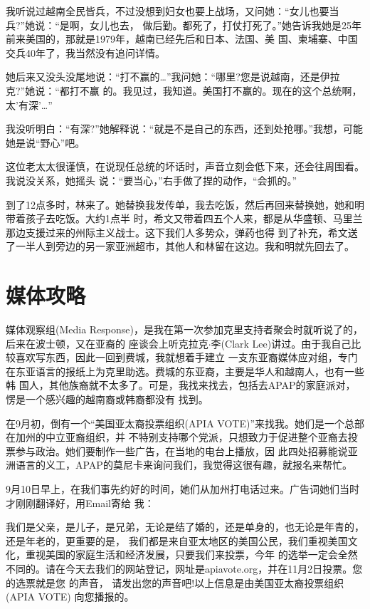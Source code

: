 ﻿\documentclass[11pt]{article}
\begin{document}
我听说过越南全民皆兵，不过没想到妇女也要上战场，又问她：``女儿也要当兵?''她说：``是啊，女儿也去，
做后勤。都死了，打仗打死了。''她告诉我她是25年前来美国的，那就是1979年，越南已经先后和日本、法国、美
国、柬埔寨、中国交兵40年了，我当然没有追问详情。

她后来又没头没尾地说：``打不赢的\ldots ''我问她：``哪里?您是说越南，还是伊拉克?''她说：``都打不赢
的。我见过，我知道。美国打不赢的。现在的这个总统啊，太'有深'\ldots ''

我没听明白：``有深?''她解释说：``就是不是自己的东西，还到处抢哪。''我想，可能她是说``野心''吧。

这位老太太很谨慎，在说现任总统的坏话时，声音立刻会低下来，还会往周围看。我说没关系，她摇头
说：``要当心，''右手做了捏的动作，``会抓的。''

到了12点多时，林来了。她替换我发传单，我去吃饭，然后再回来替换她，她和明带着孩子去吃饭。大约1点半
时，希文又带着四五个人来，都是从华盛顿、马里兰那边支援过来的州际主义战士。这下我们人多势众，弹药也得
到了补充，希文送了一半人到旁边的另一家亚洲超市，其他人和林留在这边。我和明就先回去了。

\section{媒体攻略}

媒体观察组(Media Response)，是我在第一次参加克里支持者聚会时就听说了的，后来在波士顿，又在亚裔的
座谈会上听克拉克$\cdot$李(Clark Lee)讲过。由于我自己比较喜欢写东西，因此一回到费城，我就想着手建立
一支东亚裔媒体应对组，专门在东亚语言的报纸上为克里助选。费城的东亚裔，主要是华人和越南人，也有一些韩
国人，其他族裔就不太多了。可是，我找来找去，包括去APAP的家庭派对，愣是一个感兴趣的越南裔或韩裔都没有
找到。

在9月初，倒有一个``美国亚太裔投票组织(APIA VOTE)''来找我。她们是一个总部在加州的中立亚裔组织，并
不特别支持哪个党派，只想致力于促进整个亚裔去投票参与政治。她们要制作一些广告，在当地的电台上播放，因
此四处招募能说亚洲语言的义工，APAP的莫尼卡来询问我们，我觉得这很有趣，就报名来帮忙。

9月10日早上，在我们事先约好的时间，她们从加州打电话过来。广告词她们当时才刚刚翻译好，用Email寄给
我：

我们是父亲，是儿子，是兄弟，无论是结了婚的，还是单身的，也无论是年青的，还是年老的，更重要的是，
我们都是来自亚太地区的美国公民，我们重视美国文化，重视美国的家庭生活和经济发展，只要我们来投票，今年
的选举一定会全然不同的。请在今天去我们的网站登记，网址是apiavote.org，并在11月2日投票。您的选票就是您
的声音， 请发出您的声音吧!以上信息是由美国亚太裔投票组织 (APIA VOTE) 向您播报的。
\end{document}
